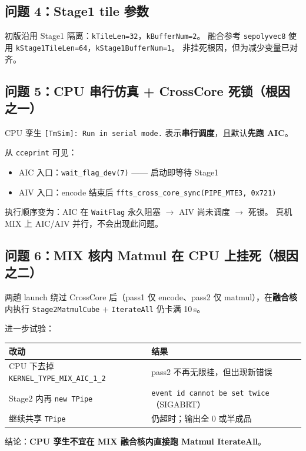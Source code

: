 \documentclass[UTF8,a4paper,11pt]{ctexart}
\begin{document}
\subsection{问题 4：Stage1 tile 参数}
初版沿用 Stage1 隔离：\texttt{kTileLen=32}，\texttt{kBufferNum=2}。
融合参考 \texttt{sepolyvec8} 使用 \texttt{kStage1TileLen=64}，\texttt{kStage1BufferNum=1}。
非挂死根因，但为减少变量已对齐。

\subsection{问题 5：CPU 串行仿真 + CrossCore 死锁（根因之一）}
CPU 孪生 \texttt{[TmSim]: Run in serial mode.} 表示\textbf{串行调度}，且默认\textbf{先跑 AIC}。

从 \texttt{cceprint} 可见：
\begin{itemize}
  \item AIC 入口：\texttt{wait\_flag\_dev(7)} —— 启动即等待 Stage1
  \item AIV 入口：encode 结束后 \texttt{ffts\_cross\_core\_sync(PIPE\_MTE3, 0x721)}
\end{itemize}

执行顺序变为：AIC 在 \texttt{WaitFlag} 永久阻塞 $\rightarrow$ AIV 尚未调度 $\rightarrow$ 死锁。
真机 MIX 上 AIC/AIV 并行，不会出现此问题。

\subsection{问题 6：MIX 核内 Matmul 在 CPU 上挂死（根因之二）}
两趟 launch 绕过 CrossCore 后（pass1 仅 encode、pass2 仅 matmul），在\textbf{融合核}内执行
\texttt{Stage2MatmulCube} + \texttt{IterateAll} 仍卡满 10\,s。

进一步试验：
\begin{table}[h]
  \centering
  \begin{tabular}{@{}L{6cm}L{6.5cm}@{}}
    \toprule
    改动 & 结果 \\
    \midrule
    CPU 下去掉 \texttt{KERNEL\_TYPE\_MIX\_AIC\_1\_2} & pass2 不再无限挂，但出现新错误 \\
    Stage2 内再 \texttt{new TPipe} & \texttt{event id cannot be set twice}（SIGABRT） \\
    继续共享 \texttt{TPipe} & 仍超时；输出全 0 或半成品 \\
    \bottomrule
  \end{tabular}
\end{table}

结论：\textbf{CPU 孪生不宜在 MIX 融合核内直接跑 Matmul IterateAll}。
\end{document}

